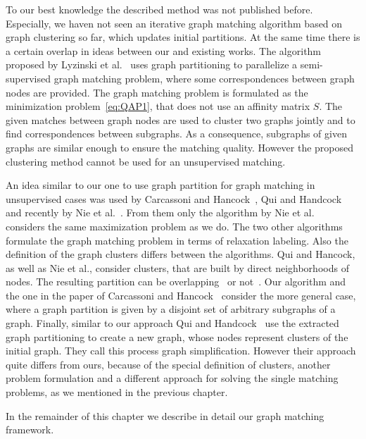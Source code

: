 To our best knowledge the described method was not published before. Especially, we haven not seen an iterative graph matching algorithm based on graph clustering so far, which updates initial partitions. At the same time there is a certain overlap in ideas between our and existing works. The algorithm proposed by Lyzinski et al.~\cite{Lyzinski2015} uses graph partitioning to parallelize a semi-supervised graph matching problem, where some correspondences between graph nodes are provided. The graph matching problem is formulated as the minimization problem~\eqref{eq:QAP1}, that does not use an affinity matrix $S$. The given matches between graph nodes are used to cluster two graphs jointly and to find correspondences between subgraphs. As a consequence, subgraphs of given graphs are similar enough to ensure the matching quality. However the proposed clustering method cannot be used for an unsupervised matching.

An idea similar to our one to use graph partition for graph matching in unsupervised cases was used by Carcassoni and Hancock~\cite{Hancock_ModalClusters}, Qui and Handcock~\cite{Hancock_GM_SpectralPart} and recently by Nie et al.~\cite{CliqueGraph_CVPR2015}. From them only the algorithm by Nie et al.~\cite{CliqueGraph_CVPR2015} considers the same maximization problem as we do. The two other algorithms formulate the graph matching problem in terms of relaxation labeling. Also the definition of the graph clusters differs between the algorithms. Qui and Hancock, as well as Nie et al., consider clusters, that are built by direct neighborhoods of nodes. The resulting partition can be overlapping~\cite{CliqueGraph_CVPR2015} or not~\cite{Hancock_GM_SpectralPart}. Our algorithm and the one in the paper of Carcassoni and Hancock~\cite{Hancock_ModalClusters} consider the more general case, where a graph partition is given by a disjoint set of arbitrary subgraphs of a graph.
Finally, similar to our approach Qui and Handcock~\cite{Hancock_GM_SpectralPart} use the extracted graph partitioning to create a new graph, whose nodes represent clusters of the initial graph. They call this process graph simplification. However their approach quite differs from ours, because of the special definition of clusters, another problem formulation and a different approach for solving the single matching problems, as we mentioned in the previous chapter.

In the remainder of this chapter we describe in detail our graph matching framework.

